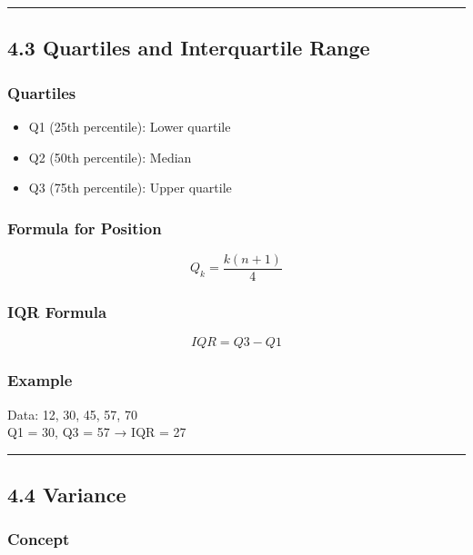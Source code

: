 \documentclass[
  letterpaper,
  DIV=11,
  numbers=noendperiod]{scrreprt}
\providecommand{\tightlist}{%
  \setlength{\itemsep}{0pt}\setlength{\parskip}{0pt}}
\begin{document}
\begin{center}\rule{0.5\linewidth}{0.5pt}\end{center}

\subsection{4.3 Quartiles and Interquartile
Range}\label{quartiles-and-interquartile-range}

\subsubsection{Quartiles}\label{quartiles}

\begin{itemize}
\tightlist
\item
  Q1 (25th percentile): Lower quartile
\item
  Q2 (50th percentile): Median
\item
  Q3 (75th percentile): Upper quartile
\end{itemize}

\subsubsection{Formula for Position}\label{formula-for-position}

\[
Q_k = \frac{k(n+1)}{4}
\]

\subsubsection{IQR Formula}\label{iqr-formula}

\[
IQR = Q3 - Q1
\]

\subsubsection{Example}\label{example-4}

Data: 12, 30, 45, 57, 70\\
Q1 = 30, Q3 = 57 → IQR = 27

\begin{center}\rule{0.5\linewidth}{0.5pt}\end{center}

\subsection{4.4 Variance}\label{variance}

\subsubsection{Concept}\label{concept}
\end{document}
